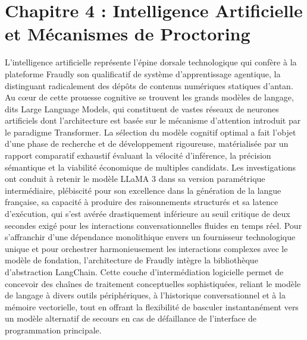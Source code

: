 \section{Chapitre 4 : Intelligence Artificielle et Mécanismes de Proctoring}

L'intelligence artificielle représente l'épine dorsale technologique qui confère à la plateforme Fraudly son qualificatif de système d'apprentissage agentique, la distinguant radicalement des dépôts de contenus numériques statiques d'antan. Au cœur de cette prouesse cognitive se trouvent les grands modèles de langage, dits Large Language Models, qui constituent de vastes réseaux de neurones artificiels dont l'architecture est basée sur le mécanisme d'attention introduit par le paradigme Transformer. La sélection du modèle cognitif optimal a fait l'objet d'une phase de recherche et de développement rigoureuse, matérialisée par un rapport comparatif exhaustif évaluant la vélocité d'inférence, la précision sémantique et la viabilité économique de multiples candidats. Les investigations ont conduit à retenir le modèle LLaMA 3 dans sa version paramétrique intermédiaire, plébiscité pour son excellence dans la génération de la langue française, sa capacité à produire des raisonnements structurés et sa latence d'exécution, qui s'est avérée drastiquement inférieure au seuil critique de deux secondes exigé pour les interactions conversationnelles fluides en temps réel. Pour s'affranchir d'une dépendance monolithique envers un fournisseur technologique unique et pour orchestrer harmonieusement les interactions complexes avec le modèle de fondation, l'architecture de Fraudly intègre la bibliothèque d'abstraction LangChain. Cette couche d'intermédiation logicielle permet de concevoir des chaînes de traitement conceptuelles sophistiquées, reliant le modèle de langage à divers outils périphériques, à l'historique conversationnel et à la mémoire vectorielle, tout en offrant la flexibilité de basculer instantanément vers un modèle alternatif de secours en cas de défaillance de l'interface de programmation principale.

